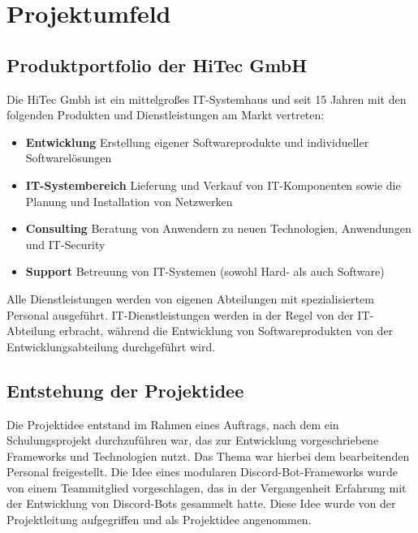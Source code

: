 
\section{Projektumfeld}\label{projektumfeld}

\subsection{Produktportfolio der HiTec GmbH}\label{produktportfolio-der-hitec-gmbh}
Die HiTec Gmbh ist ein mittelgroßes IT-Systemhaus und seit 15 Jahren mit den folgenden Produkten und Dienstleistungen am Markt vertreten:

\begin{itemize}
        \item \textbf{Entwicklung} Erstellung eigener Softwareprodukte und individueller Softwarelösungen
        \item \textbf{IT-Systembereich} Lieferung und Verkauf von IT-Komponenten sowie die Planung und Installation von Netzwerken
        \item \textbf{Consulting} Beratung von Anwendern zu neuen Technologien, Anwendungen und IT-Security 
        \item \textbf{Support} Betreuung von IT-Systemen (sowohl Hard- als auch Software)
\end{itemize}
    
Alle Dienstleistungen werden von eigenen Abteilungen mit spezialisiertem Personal ausgeführt. IT-Dienstleistungen werden in der Regel von der IT-Abteilung erbracht, während die Entwicklung von Softwareprodukten von der Entwicklungsabteilung durchgeführt wird.

\subsection{Entstehung der Projektidee}\label{entstehung-der-projektidee}

Die Projektidee entstand im Rahmen eines Auftrags, nach dem ein Schulungsprojekt durchzuführen war, das zur Entwicklung vorgeschriebene Frameworks und Technologien nutzt. Das Thema war hierbei dem bearbeitenden Personal freigestellt. Die Idee eines modularen Discord-Bot-Frameworks wurde von einem Teammitglied vorgeschlagen, das in der Vergangenheit Erfahrung mit der Entwicklung von Discord-Bots gesammelt hatte. Diese Idee wurde von der Projektleitung aufgegriffen und als Projektidee angenommen.